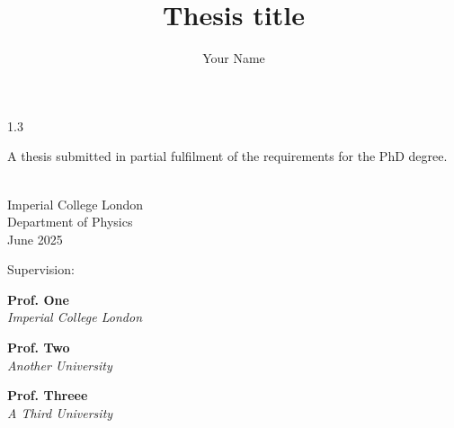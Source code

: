 \documentclass[11pt,a4paper,twoside]{report}
\author{Your Name}
\title{Thesis title}
\date{}
\begin{document}
\begin{titlepage}
	\vspace*{-0.75in}
	\hspace*{-.25in}
		\vspace*{2cm}
		\makeatletter
		\begin{spacing}{1.3}
			\noindent\Huge\color{darker}\scshape\bfseries\@title
		\end{spacing}

		\vspace{-.3cm}
		\large
		\noindent A thesis submitted in partial fulfilment of the requirements for the PhD degree.

		\vspace{1.5cm}
		\noindent\textbf{\@author} \\
		\noindent Imperial College London\\
		Department of Physics\\
		June 2025

		\makeatother

		\vspace{3.cm}
		\large
		\noindent Supervision:

		\vspace{0.7cm}
		\noindent\textbf{Prof. One} \\
		\emph{Imperial College London}

		\vspace{0.7cm}
		\noindent\textbf{Prof. Two} \\
		\emph{Another University}

		\vspace{0.7cm}
		\noindent\textbf{Prof. Threee} \\
		\emph{A Third University}

		\vspace{1.5cm}

\end{titlepage}




\tableofcontents
\listoffigures
\end{document}

